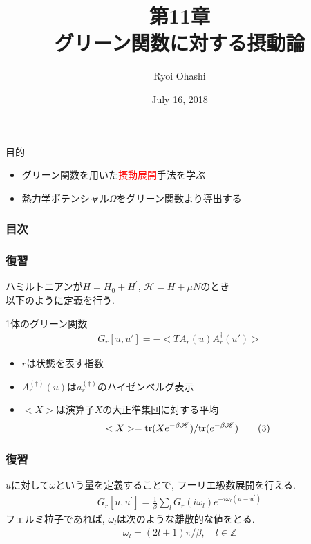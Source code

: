 \documentclass[dvipdfmx,11pt]{beamer}
\title{第11章\\グリーン関数に対する摂動論}
\author{Ryoi Ohashi}
\date{July 16, 2018}
\institute{Department of Applied Physics, Nagoya University}
\begin{document}
\begin{frame}[plain]
    \maketitle
\end{frame}

\begin{frame}{目的}
    \begin{itemize}
        \item グリーン関数を用いた\textcolor{red}{摂動展開}手法を学ぶ
        \item 熱力学ポテンシャル$\Omega$をグリーン関数より導出する
    \end{itemize}
\end{frame}

\begin{frame}\frametitle{目次}
    \setcounter{tocdepth}{1}
    \tableofcontents
\end{frame}

\begin{frame}\frametitle{復習}
    ハミルトニアンが$H=H_0+H^{'}$, $\mathscr{H}=H+\mu N$のとき\\
    以下のように定義を行う.
    \begin{block}{1体のグリーン関数}
        \begin{align}
            G_r[u,u'] = -<TA_r(u)A_r^{\dagger}(u')> \tag{1}
        \end{align}
    \end{block}
    \begin{itemize}
        \item $r$は状態を表す指数\\
        \item $A_r^{(\dagger)}(u)$は$a_r^{(\dagger)}$のハイゼンベルグ表示\\
        \item $<X>$は演算子$X$の大正準集団に対する平均
        \begin{align}
            <X>={\rm tr}(X e^{-\beta\mathscr{H}})/{\rm tr}(e^{-\beta\mathscr{H}}) \tag{3}
        \end{align}
        
    \end{itemize}
\end{frame}

\begin{frame}\frametitle{復習}
    $u$に対して$\omega$という量を定義することで, フーリエ級数展開を行える.
    \begin{align}
        G_r[u,u^{'}] = \frac{1}{\beta}\sum_lG_r(i\omega_l)e^{-i\omega_l(u-u^{'})}
    \end{align}
    フェルミ粒子であれば, $\omega_l$は次のような離散的な値をとる.
    \begin{align}
        \omega_l = (2l+1)\pi/\beta,\quad l\in \mathbb{Z}
    \end{align}
\end{frame}
\end{document}
